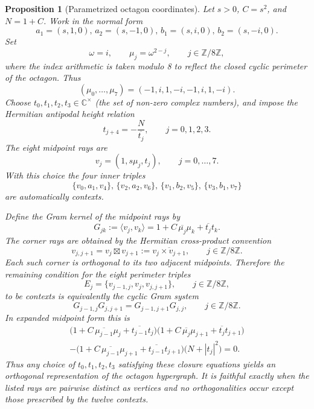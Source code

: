 \documentclass[
  twocolumn,
  aps,
  pra,
  floatfix,
  amsmath,amssymb,
  longbibliography
]{revtex4-2}
\newtheorem{proposition}[theorem]{Proposition}
\theoremstyle{definition}
\theoremstyle{remark}
\begin{document}
\begin{proposition}[Parametrized octagon coordinates]
\label{prop:octagon_param_C}
Let \(s>0\), \(C=s^2\), and \(N=1+C\).  Work in the normal form
\[
  a_1=(s,1,0),\,
  a_2=(s,-1,0),\,
  b_1=(s,i,0),\,
  b_2=(s,-i,0).
\]
Set
\[
  \omega=i,
  \qquad
  \mu_j=\omega^{2-j},
  \qquad j\in\mathbb Z/8\mathbb Z ,
\]
where the index arithmetic is taken modulo 8 to reflect the closed cyclic perimeter of the octagon.
Thus
\[
  (\mu_0,\ldots,\mu_7)=(-1,i,1,-i,-1,i,1,-i).
\]
Choose \(t_0,t_1,t_2,t_3\in\mathbb C^\times\)  (the set of non-zero complex numbers), and impose the
Hermitian antipodal height relation
\[
  t_{j+4}=-\frac{N}{\overline{t_j}},
  \qquad j=0,1,2,3 .
\]
The eight midpoint rays are
\[
  v_j=(1,s\mu_j,t_j),
  \qquad j=0,\ldots,7 .
\]
With this choice the four inner triples
\[
  \{v_0,a_1,v_4\},\,
  \{v_2,a_2,v_6\},\,
  \{v_1,b_2,v_5\},\,
  \{v_3,b_1,v_7\}
\]
are automatically contexts.

Define the Gram kernel of the midpoint rays by
\[
  G_{jk}:=\langle v_j,v_k\rangle
  =1+C\,\overline{\mu_j}\mu_k+\overline{t_j}t_k .
\]
The corner rays are obtained by the Hermitian cross-product convention
\[
  v_{j,j+1}=v_j\boxtimes v_{j+1}:=\overline{v_j\times v_{j+1}},
  \qquad j\in\mathbb Z/8\mathbb Z.
\]
Each such corner is orthogonal to its two adjacent midpoints. Therefore the
remaining condition for the eight perimeter triples
\[
  E_j=\{v_{j-1,j},v_j,v_{j,j+1}\},
  \qquad j\in\mathbb Z/8\mathbb Z,
\]
to be contexts is equivalently the cyclic Gram system
\begin{equation}
  G_{j-1,j}G_{j,j+1}=G_{j-1,j+1}G_{j,j},
  \qquad j\in\mathbb Z/8\mathbb Z .
  \label{eq:octagon_G_closure}
\end{equation}
In expanded midpoint form this is
\begin{multline}
\bigl(1+C\,\overline{\mu_{j-1}}\mu_j+\overline{t_{j-1}}t_j\bigr)
\bigl(1+C\,\overline{\mu_j}\mu_{j+1}+\overline{t_j}t_{j+1}\bigr)\\
-
\bigl(1+C\,\overline{\mu_{j-1}}\mu_{j+1}
       +\overline{t_{j-1}}t_{j+1}\bigr)
\bigl(N+|t_j|^2\bigr)
=0 .
\label{eq:octagon_explicit_closure}
\end{multline}
Thus any choice of \(t_0,t_1,t_2,t_3\) satisfying these closure
equations yields an orthogonal representation of the octagon hypergraph.
It is faithful exactly when the listed rays are pairwise distinct as
vertices and no orthogonalities occur except those prescribed by the
twelve contexts.
\end{proposition}
\end{document}

